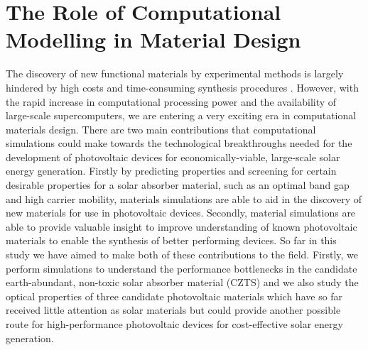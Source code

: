 \section{The Role of Computational Modelling in Material Design}
The discovery of new functional materials by experimental methods is largely hindered by high costs and time-consuming synthesis procedures \cite{high_tp}.
However, with the rapid increase in computational processing power and the availability of large-scale supercomputers, we are entering a very exciting era in computational materials design. 
There are two main contributions that computational simulations could make towards the technological breakthroughs needed for the development of photovoltaic devices for economically-viable, large-scale solar energy generation. Firstly by predicting properties and screening for certain desirable properties for a solar absorber material, such as an optimal band gap and high carrier mobility, materials simulations are able to aid in the discovery of new materials for use in photovoltaic devices. Secondly, material simulations are able to provide valuable insight to improve understanding of known photovoltaic materials to enable the synthesis of better performing devices. So far in this study we have aimed to make both of these contributions to the field. Firstly, we perform simulations to understand the performance bottlenecks in the candidate earth-abundant, non-toxic solar absorber material \CZTS (CZTS) and we also study the optical properties of three candidate photovoltaic materials which have so far received little attention as solar materials but could provide another possible route for high-performance photovoltaic devices for cost-effective solar energy generation.


